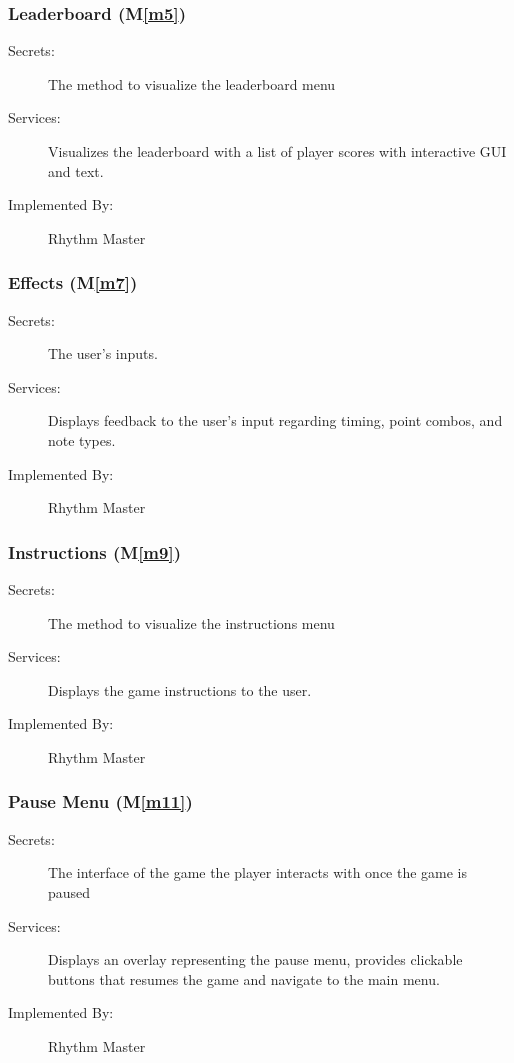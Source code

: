 \documentclass[12pt, titlepage]{article}
\newcommand{\mref}[1]{M\ref{#1}}
\begin{document}
\subsubsection{Leaderboard (\mref{m5})}

\begin{description}
\item[Secrets:]The method to visualize the leaderboard menu
\item[Services:]Visualizes the leaderboard with a list of player scores with interactive GUI and text.
\item[Implemented By:] Rhythm Master
\end{description}

\subsubsection{Effects (\mref{m7})}

\begin{description}
\item[Secrets:]The user's inputs.
\item[Services:]Displays feedback to the user's input regarding timing, point combos, and note types.
\item[Implemented By:] Rhythm Master
\end{description}

\subsubsection{Instructions (\mref{m9})}

\begin{description}
\item[Secrets:] The method to visualize the instructions menu
\item[Services:] Displays the game instructions to the user.
\item[Implemented By:] Rhythm Master
\end{description}

\subsubsection{Pause Menu (\mref{m11})}

\begin{description}
\item[Secrets:] The interface of the game the player interacts with once the game is paused
\item[Services:] Displays an overlay representing the pause menu, provides clickable buttons that resumes the game and navigate to the main menu.
\item[Implemented By:] Rhythm Master
\end{description}
\end{document}
